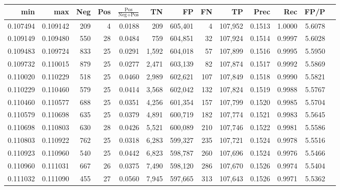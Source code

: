 \begin{tabular}{rrrrrrrrrrrrr}
\toprule
     min &      max & Neg & Pos & $\frac{\text{Pos}}{\text{Neg}+\text{Pos}}$ &      TN &      FP &      FN &      TP &   Prec &    Rec &   FP/P \\
\midrule
0.107494 & 0.109142 & 209 &   4 &                                     0.0188 &     209 & 605,401 &       4 & 107,952 & 0.1513 & 1.0000 & 5.6078 \\
0.109149 & 0.109480 & 550 &  28 &                                     0.0484 &     759 & 604,851 &      32 & 107,924 & 0.1514 & 0.9997 & 5.6028 \\
0.109483 & 0.109724 & 833 &  25 &                                     0.0291 &   1,592 & 604,018 &      57 & 107,899 & 0.1516 & 0.9995 & 5.5950 \\
0.109732 & 0.110015 & 879 &  25 &                                     0.0277 &   2,471 & 603,139 &      82 & 107,874 & 0.1517 & 0.9992 & 5.5869 \\
0.110020 & 0.110229 & 518 &  25 &                                     0.0460 &   2,989 & 602,621 &     107 & 107,849 & 0.1518 & 0.9990 & 5.5821 \\
0.110229 & 0.110460 & 579 &  25 &                                     0.0414 &   3,568 & 602,042 &     132 & 107,824 & 0.1519 & 0.9988 & 5.5767 \\
0.110460 & 0.110577 & 688 &  25 &                                     0.0351 &   4,256 & 601,354 &     157 & 107,799 & 0.1520 & 0.9985 & 5.5704 \\
0.110579 & 0.110698 & 635 &  25 &                                     0.0379 &   4,891 & 600,719 &     182 & 107,774 & 0.1521 & 0.9983 & 5.5645 \\
0.110698 & 0.110803 & 630 &  28 &                                     0.0426 &   5,521 & 600,089 &     210 & 107,746 & 0.1522 & 0.9981 & 5.5586 \\
0.110803 & 0.110922 & 762 &  25 &                                     0.0318 &   6,283 & 599,327 &     235 & 107,721 & 0.1524 & 0.9978 & 5.5516 \\
0.110923 & 0.110960 & 540 &  25 &                                     0.0442 &   6,823 & 598,787 &     260 & 107,696 & 0.1524 & 0.9976 & 5.5466 \\
0.110960 & 0.111031 & 667 &  26 &                                     0.0375 &   7,490 & 598,120 &     286 & 107,670 & 0.1526 & 0.9974 & 5.5404 \\
0.111032 & 0.111090 & 455 &  27 &                                     0.0560 &   7,945 & 597,665 &     313 & 107,643 & 0.1526 & 0.9971 & 5.5362 \\

\end{tabular}
